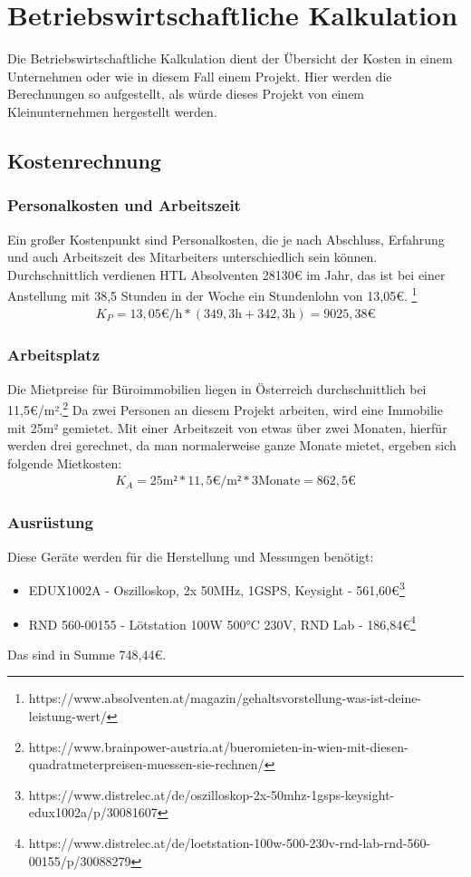 \documentclass[paper=a4, 12pt]{scrreprt}
\begin{document}
\chapter{Betriebswirtschaftliche Kalkulation}\hfill \break
Die Betriebswirtschaftliche Kalkulation dient der Übersicht der Kosten in einem Unternehmen oder wie in diesem Fall einem Projekt. Hier werden die Berechnungen so aufgestellt, als würde dieses Projekt von einem Kleinunternehmen hergestellt werden. 
	\section{Kostenrechnung}\hfill \break
		\subsection{Personalkosten und Arbeitszeit}\hfill \break
		Ein großer Kostenpunkt sind Personalkosten, die je nach Abschluss, Erfahrung und auch Arbeitszeit des Mitarbeiters unterschiedlich sein können.
		Durchschnittlich verdienen HTL Absolventen 28130€ im Jahr, das ist bei einer Anstellung mit 38,5 Stunden in der Woche ein Stundenlohn von 13,05€. \footnote{https://www.absolventen.at/magazin/gehaltsvorstellung-was-ist-deine-leistung-wert/}
		\begin{align*} 
		K_{ P } = 13,05\text{€/h} * (349,3\text{h} + 342,3\text{h}) = 9025,38\text{€}
		\end{align*} 
		\subsection{Arbeitsplatz}\hfill \break
		Die Mietpreise für Büroimmobilien liegen in Österreich durchschnittlich bei 11,5€/m².\footnote{https://www.brainpower-austria.at/bueromieten-in-wien-mit-diesen-quadratmeterpreisen-muessen-sie-rechnen/} Da zwei Personen an diesem Projekt arbeiten, wird eine Immobilie mit 25m² gemietet. Mit einer Arbeitszeit von etwas über zwei Monaten, hierfür werden drei gerechnet, da man normalerweise ganze Monate mietet, ergeben sich folgende Mietkosten:
		\begin{align*} 
		K_{ A } = 25\text{m²} * 11,5\text{€/m²} * 3\text{Monate} = 862,5\text{€}
		\end{align*} 
		\subsection{Ausrüstung}\hfill \break
		Diese Geräte werden für die Herstellung und Messungen benötigt:
		\begin{itemize}
			\item EDUX1002A - Oszilloskop, 2x 50MHz, 1GSPS, Keysight - 561,60€\footnote{https://www.distrelec.at/de/oszilloskop-2x-50mhz-1gsps-keysight-edux1002a/p/30081607}
			\item RND 560-00155 - Lötstation 100W 500°C 230V, RND Lab - 186,84€\footnote{https://www.distrelec.at/de/loetstation-100w-500-230v-rnd-lab-rnd-560-00155/p/30088279}
		\end{itemize}
		Das sind in Summe 748,44€.
		\newpage
		
\end{document}
